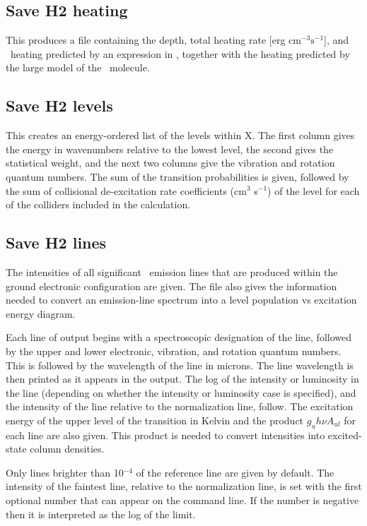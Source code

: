 \subsection{Save H2 heating}

This produces a file containing the depth, total heating rate [erg
cm$^{-3}\mathrm{s}^{-1}$], and \htwo\ heating predicted by an expression in \citet{Tielens1985a}, together with the heating predicted by the large model of the \htwo\ molecule.

\subsection{Save H2 levels}

This creates an energy-ordered list of the levels within X.  The first
column gives the energy in wavenumbers relative to the lowest level, the
second gives the statistical weight, and the next two columns give the
vibration and rotation quantum numbers.  The sum of the transition
probabilities is given, followed by the sum of collisional de-excitation rate
coefficients (cm$^{3}$ s$^{-1}$) of the level for each of the colliders 
included in the calculation.

\subsection{Save H2 lines}

The intensities of all significant \htwo\ emission lines that are produced
within the ground electronic configuration are given.  The file also gives the
information needed to convert an emission-line spectrum into a level
population vs excitation energy diagram.

Each line of output begins with a spectroscopic designation of the line,
followed by the upper and lower electronic, vibration, and rotation quantum
numbers.
This is followed by the wavelength of the line in microns.
The
line wavelength is then printed as it appears in the output.
The log of
the intensity or luminosity in the line (depending on whether the intensity
or luminosity case is specified), and the intensity of the line relative
to the normalization line, follow.
The excitation energy of the upper
level of the transition in Kelvin and the product
$g_u h\nu A_{ul} $  for each line are also given.
This product is needed to convert
intensities into excited-state column densities.

Only lines brighter than 10$^{-4}$ of the reference line are given by default.
The intensity of the faintest line, relative to the normalization line,
is set with the first optional number that can appear on the command line.
If the number is negative then it is interpreted as the log of the limit.

